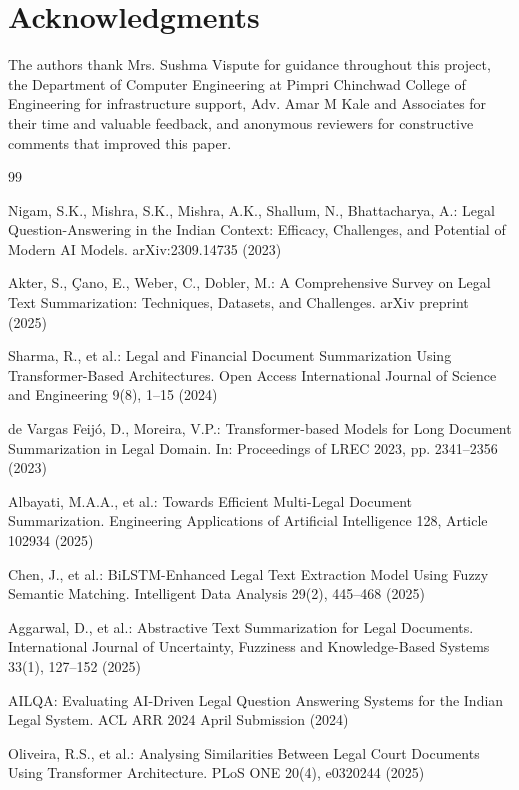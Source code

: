 \documentclass{llncs}
\begin{document}
\section*{Acknowledgments}

The authors thank Mrs. Sushma Vispute for guidance throughout this project, the Department of Computer Engineering at Pimpri Chinchwad College of Engineering for infrastructure support, Adv. Amar M Kale and Associates for their time and valuable feedback, and anonymous reviewers for constructive comments that improved this paper.

\begin{thebibliography}{99}

Nigam, S.K., Mishra, S.K., Mishra, A.K., Shallum, N., Bhattacharya, A.: Legal Question-Answering in the Indian Context: Efficacy, Challenges, and Potential of Modern AI Models. arXiv:2309.14735 (2023)

Akter, S., Çano, E., Weber, C., Dobler, M.: A Comprehensive Survey on Legal Text Summarization: Techniques, Datasets, and Challenges. arXiv preprint (2025)

Sharma, R., et al.: Legal and Financial Document Summarization Using Transformer-Based Architectures. Open Access International Journal of Science and Engineering 9(8), 1--15 (2024)

de Vargas Feijó, D., Moreira, V.P.: Transformer-based Models for Long Document Summarization in Legal Domain. In: Proceedings of LREC 2023, pp. 2341--2356 (2023)

Albayati, M.A.A., et al.: Towards Efficient Multi-Legal Document Summarization. Engineering Applications of Artificial Intelligence 128, Article 102934 (2025)

Chen, J., et al.: BiLSTM-Enhanced Legal Text Extraction Model Using Fuzzy Semantic Matching. Intelligent Data Analysis 29(2), 445--468 (2025)

Aggarwal, D., et al.: Abstractive Text Summarization for Legal Documents. International Journal of Uncertainty, Fuzziness and Knowledge-Based Systems 33(1), 127--152 (2025)

AILQA: Evaluating AI-Driven Legal Question Answering Systems for the Indian Legal System. ACL ARR 2024 April Submission (2024)

Oliveira, R.S., et al.: Analysing Similarities Between Legal Court Documents Using Transformer Architecture. PLoS ONE 20(4), e0320244 (2025)


\end{thebibliography}
\end{document}
